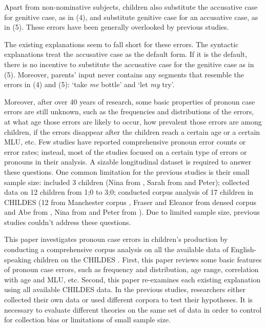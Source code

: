 Apart from non-nominative subjects, children also substitute the accusative case for genitive case, as in (4), and substitute genitive case for an accusative case, as in (5). These errors have been generally overlooked by previous studies.
\begin{exe}
\end{exe}
The existing explanations seem to fall short for these errors. The syntactic explanations treat the accusative case as the default form. If it is the default, there is no incentive to substitute the accusative case for the genitive case as in (5). Moreover, parents' input never contains any segments that resemble the errors in (4) and (5): `take \textit{me} bottle' and `let \textit{my} try'. 

Moreover, after over 40 years of research, some basic properties of pronoun case errors are still unknown, such as the frequencies and distributions of the errors, at what age  those errors are likely to occur, how prevalent those errors are among children, if the errors disappear after the children reach a certain age or a certain MLU, etc. Few studies have reported comprehensive pronoun error counts or error rates; instead, most of the studies focused on a certain type of errors or pronouns in their analysis. A sizable longitudinal dataset is required to answer these questions. One common limitation for the previous studies is their small sample size: \cite{schutze1996subject} included 3 children (Nina from \citep{suppes1974semantics}, Sarah from \citep{brown1973first} and Peter\citep{bloom1974imitation}); \cite{rispoli1998} collected data on 12 children from 1;0 to 3;0; \cite{kirjavainen2009can} conducted corpus analysis of 17 children in CHILDES (12 from Manchester corpus \cite{theakston2001}, Fraser and Eleanor from densed corpus \citep{rowland2006effect} and Abe from \cite{kuczaj1977acquisition}, Nina from \citep{suppes1974semantics} and Peter from \citep{bloom1974imitation}). Due to limited sample size, previous studies couldn't address these questions. 

This paper investigates pronoun case errors in children's production by conducting a comprehensive corpus analysis on all the available data of English-speaking children on the CHILDES \citep{macwhinney2014childes}. First, this paper reviews some basic features of pronoun case errors, such as frequency and distribution, age range, correlation with age and MLU, etc. Second, this paper re-examines each existing explanation using all available CHILDES data. In the previous studies, researchers either collected their own data or used different corpora to test their hypotheses. It is necessary to evaluate different theories on the same set of data in order to control for collection bias or limitations of small sample size. 


